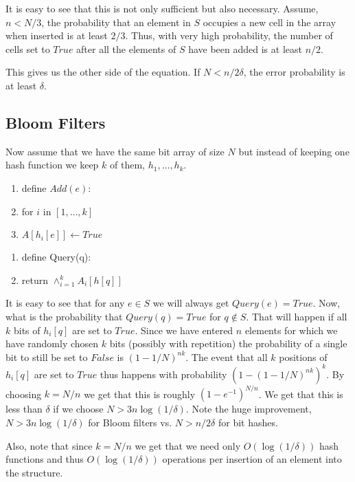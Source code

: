\documentclass{article}
\newcommand{\tab}{\hspace{.5cm}}
\begin{document}
It is easy to see that this is not only sufficient but also necessary. 
Assume, $n < N/3$, the probability that an element in $S$ occupies a new cell in the 
array when inserted is at least $2/3$. Thus, with very high probability, the number of 
cells set to $True$ after all the elements of $S$ have been added is at least $n/2$.

This gives us the other side of the equation. If $N < n/2\delta$, the error probability is at least $\delta$.


\subsection*{Bloom Filters}

Now assume that we have the same bit array of size $N$ but instead of keeping one hash 
function we keep $k$ of them, $h_1,\ldots,h_k$.
\begin{enumerate}
\item define  $Add(e)$:
\item \tab for $i$ in $[1,\ldots,k]$
\item \tab \tab $A[h_i[e]] \leftarrow True$ 
\end{enumerate}

\begin{enumerate}
\item define  Query(q):
\item \tab return $\wedge_{i=1}^{k}A_i[h[q]]$ 
\end{enumerate}


It is easy to see that for any $e \in S$ we will always get $Query(e) = True$.
Now, what is the probability that $Query(q) = True$ for $q \not \in S$.
That will happen if all $k$ bits of $h_i[q]$ are set to $True$.
Since we have entered $n$ elements for which we have randomly chosen $k$
bits (possibly with repetition) the probability of a single bit to still be set to $False$ is 
$(1-1/N)^{nk}$. The event that all $k$ positions of $h_i[q]$ are set to $True$ thus happens with 
probability $(1 - (1-1/N)^{nk} )^{k}$. By choosing $k = N/n$ we get that this is roughly $(1-e^{-1})^{N/n}$.
We get that this is less than $\delta$ if we choose $N > 3n  \log(1/\delta)$.
Note the huge improvement, $N > 3n  \log(1/\delta)$ for Bloom filters vs. $N > n/2\delta$ for bit hashes.

Also, note that since $k = N/n$ we get that we need only  $O(\log(1/\delta))$ 
hash functions and thus $O(\log(1/\delta))$ operations per insertion of an element into the structure.
\end{document}
